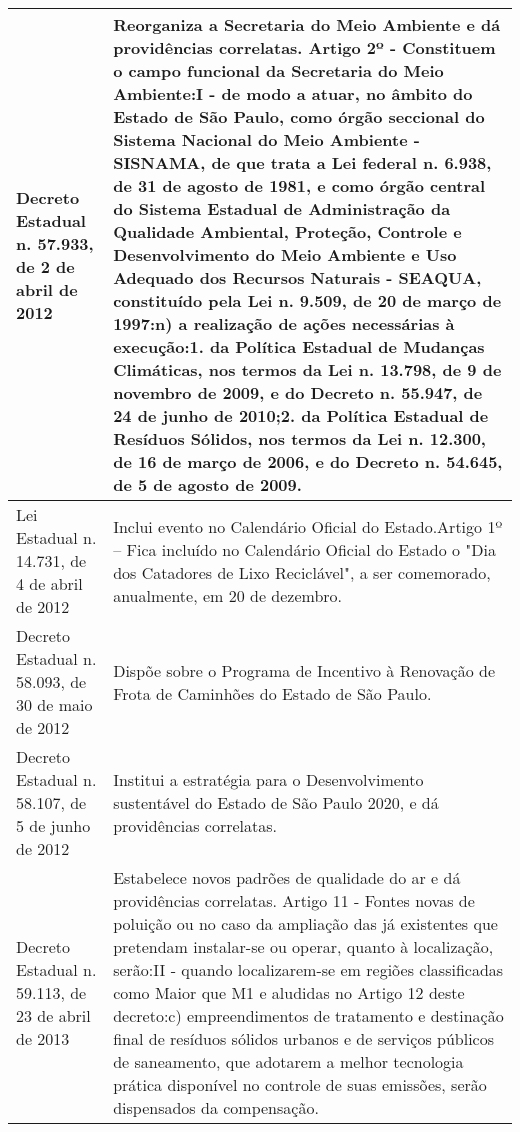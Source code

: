 \begin{center}
\begin{longtable}{|p{}|p{}|}
			\hline
			Decreto Estadual n. 57.933, de 2 de abril de 2012 & Reorganiza a Secretaria do Meio Ambiente e dá providências correlatas. Artigo 2º - Constituem o campo funcional da Secretaria do Meio Ambiente:\newline{}I - de modo a atuar, no âmbito do Estado de São Paulo, como órgão seccional do Sistema Nacional do Meio Ambiente - SISNAMA, de que trata a Lei federal n. 6.938, de 31 de agosto de 1981, e como órgão central do Sistema Estadual de Administração da Qualidade Ambiental, Proteção, Controle e Desenvolvimento do   Meio   Ambiente   e   Uso   Adequado   dos   Recursos   Naturais   -   SEAQUA, constituído pela Lei n. 9.509, de 20 de março de 1997:\newline{}n) a realização de ações necessárias à execução:\newline{}1. da Política Estadual de Mudanças Climáticas, nos termos da Lei n. 13.798, de 9 de novembro de 2009, e do Decreto n. 55.947, de 24 de junho de 2010;\newline{}2. da Política Estadual de Resíduos Sólidos, nos termos da Lei n. 12.300, de 16 de março de 2006, e do Decreto n. 54.645, de 5 de agosto de 2009. \\
			\hline
			Lei Estadual n. 14.731, de 4 de abril de 2012 & Inclui evento no Calendário Oficial do Estado.\newline{}Artigo 1º – Fica incluído no Calendário Oficial do Estado o "Dia dos Catadores de Lixo Reciclável", a ser comemorado, anualmente, em 20 de dezembro. \\
			\hline
			Decreto Estadual n. 58.093, de 30 de maio de 2012 & Dispõe sobre o Programa de Incentivo à Renovação de Frota de Caminhões do Estado de São Paulo. \\
			\hline
			Decreto Estadual n. 58.107, de 5 de junho de 2012 & Institui a estratégia para o Desenvolvimento sustentável do Estado de São Paulo 2020, e dá providências correlatas. \\
			\hline
			Decreto Estadual n. 59.113, de 23 de abril de 2013 & Estabelece novos padrões de qualidade do ar e dá providências correlatas. Artigo 11 - Fontes novas de poluição ou no caso da ampliação das já existentes que pretendam instalar-se ou operar, quanto à localização, serão:\newline{}II  -  quando  localizarem-se  em  regiões  classificadas  como  Maior  que  M1  e aludidas no Artigo 12 deste decreto:\newline{}c)  empreendimentos  de  tratamento  e  destinação  final  de  resíduos  sólidos urbanos  e   de   serviços  públicos   de   saneamento,  que  adotarem  a  melhor tecnologia prática disponível no controle de suas emissões, serão dispensados da compensação. \\

\end{longtable}
\end{center}
